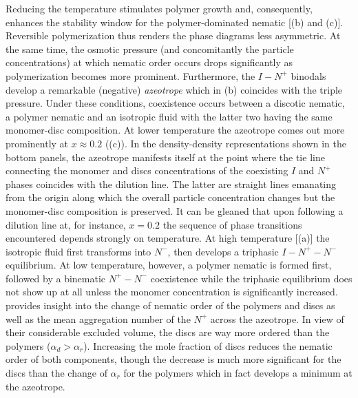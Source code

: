 Reducing the temperature stimulates polymer growth and, consequently, enhances the stability window for the polymer-dominated nematic  [(b) and (c)]. Reversible polymerization thus renders the phase diagrams less asymmetric.  At the same time, the osmotic pressure (and concomitantly the particle concentrations) at which nematic order occurs drops significantly as polymerization becomes more prominent. Furthermore, the $I-N^{+}$ binodals develop a remarkable (negative) {\em azeotrope} which in (b) coincides with the triple pressure. Under these conditions,  coexistence occurs between a discotic nematic,  a polymer nematic and an isotropic fluid with the latter two having the same monomer-disc composition. At lower temperature the azeotrope comes out more prominently at $x\approx 0.2$ ((c)). In the density-density representations shown in the bottom panels, the azeotrope manifests itself at the point where the tie line connecting the monomer and discs concentrations of the coexisting $I$ and $N^{+}$ phases coincides with the dilution line. The latter are straight lines emanating from the origin along which the overall particle concentration changes but the monomer-disc composition is preserved.  It can  be gleaned that upon following a dilution line at, for instance, $x=0.2$  the sequence of phase transitions encountered depends strongly on temperature. At high temperature [(a)] the isotropic fluid first transforms into $N^{-}$, then develops a triphasic $I-N^{+}-N^{-}$ equilibrium. At low temperature, however, a polymer nematic is formed first, followed by a binematic $N^{+}-N^{-}$ coexistence while the triphasic equilibrium does not show up at all unless the monomer concentration is significantly increased.    provides insight into the change of nematic order of the polymers and discs as well as the mean aggregation number of the $N^{+}$ across the azeotrope. In view of their considerable excluded volume, the discs are way more ordered than the polymers ($\alpha_{d} >\alpha_{r}$).  Increasing the  mole fraction of discs  reduces the nematic order of both components, though the decrease is much more significant for the discs than the change of $\alpha_{r}$ for the polymers which in fact develops a minimum at the azeotrope.

